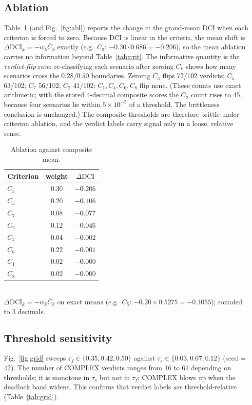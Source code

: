 \documentclass[journal]{IEEEtran}
\newcommand{\DCI}{\mathrm{DCI}}
\begin{document}
\subsection{Ablation}
Table~\ref{tab:abl} (and Fig.~\ref{fig:abl}) reports the change in the
grand-mean $\DCI$ when each criterion is forced to zero. Because $\DCI$
is linear in the criteria, the mean shift is
$\Delta\DCI_k=-w_k\bar{C}_k$ exactly (e.g.\
$C_3$: $-0.30\cdot0.686=-0.206$), so the mean ablation carries no
information beyond Table~\ref{tab:crit}. The informative quantity is the
\emph{verdict-flip} rate: re-classifying each scenario after zeroing $C_k$
shows how many scenarios cross the $0.28/0.50$ boundaries. Zeroing $C_3$
flips 72/102 verdicts; $C_5$ 63/102; $C_7$ 56/102; $C_2$ 41/102;
$C_1,C_4,C_6,C_8$ flip none. (These counts use exact arithmetic; with
the stored 4-decimal composite scores the $C_2$ count rises to 45,
because four scenarios lie within $5\times10^{-5}$ of a threshold.
The brittleness conclusion is unchanged.) The composite thresholds are
therefore brittle under criterion ablation, and the verdict labels carry
signal only in a loose, relative sense.

\begin{table}[h]
\centering
\caption{Ablation against composite mean.}
\label{tab:abl}
\begin{tabular}{lcc}
\toprule
Criterion & weight & $\Delta\DCI$ \\
\midrule
$C_3$ & 0.30 & $-0.206$ \\
$C_5$ & 0.20 & $-0.106$ \\
$C_7$ & 0.08 & $-0.077$ \\
$C_2$ & 0.12 & $-0.046$ \\
$C_4$ & 0.04 & $-0.002$ \\
$C_6$ & 0.22 & $-0.001$ \\
$C_1$ & 0.02 & $-0.000$ \\
$C_8$ & 0.02 & $-0.000$ \\
\bottomrule
\end{tabular}
\\[2pt]
\footnotesize$\Delta\DCI_k=-w_k\bar{C}_k$ on exact means (e.g.\
$C_5$: $-0.20\times0.5275=-0.1055$); rounded to 3 decimals.
\end{table}

\subsection{Threshold sensitivity}
Fig.~\ref{fig:grid} sweeps $\tau_f\in\{0.35,0.42,0.50\}$ against
$\tau_s\in\{0.03,0.07,0.12\}$ (seed = 42). The number of COMPLEX
verdicts ranges from 16 to 61 depending on thresholds; it is monotone in
$\tau_s$ but not in $\tau_f$: COMPLEX blows up when the deadlock band
widens. This confirms that verdict labels \emph{are}
threshold-relative (Table~\ref{tab:grid}).
\end{document}
